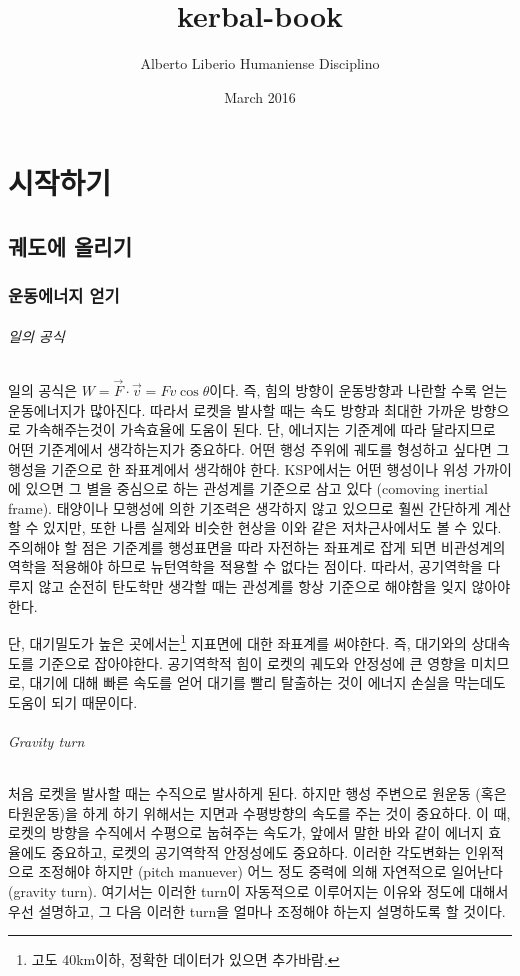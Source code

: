 \documentclass[9pt,twoside,openany]{amsbook}
\title{kerbal-book}
\author{Alberto Liberio Humaniense Disciplino}
\date{March 2016}
\begin{document}

\maketitle
\sf

\tableofcontents
\part{시작하기}
\chapter{궤도에 올리기}
\section{운동에너지 얻기}
\paragraph{일의 공식}
일의 공식은 $W=\vec{F} \cdot \vec{v} = F v \cos\theta$이다. 
즉, 힘의 방향이 운동방향과 나란할 수록 얻는 운동에너지가 많아진다. 
따라서 로켓을 발사할 때는 속도 방향과 최대한 가까운 방향으로 가속해주는것이 가속효율에 도움이 된다.
단, 에너지는 기준계에 따라 달라지므로 어떤 기준계에서 생각하는지가 중요하다. 
어떤 행성 주위에 궤도를 형성하고 싶다면 그 행성을 기준으로 한 좌표계에서 생각해야 한다. 
KSP에서는 어떤 행성이나 위성 가까이에 있으면 그 별을 중심으로 하는 관성계를 기준으로 삼고 있다 (comoving inertial frame). 
태양이나 모행성에 의한 기조력은 생각하지 않고 있으므로 훨씬 간단하게 계산할 수 있지만, 또한 나름 실제와 비슷한 현상을 이와 같은 저차근사에서도 볼 수 있다. 
주의해야 할 점은 기준계를 행성표면을 따라 자전하는 좌표계로 잡게 되면 비관성계의 역학을 적용해야 하므로 뉴턴역학을 적용할 수 없다는 점이다. 
따라서, 공기역학을 다루지 않고 순전히 탄도학만 생각할 때는 관성계를 항상 기준으로 해야함을 잊지 않아야 한다.

단, 대기밀도가 높은 곳에서는\footnote{고도 40km이하, 정확한 데이터가 있으면 추가바람.} 지표면에 대한 좌표계를 써야한다. 즉, 대기와의 상대속도를 기준으로 잡아야한다. 공기역학적 힘이 로켓의 궤도와 안정성에 큰 영향을 미치므로, 대기에 대해 빠른 속도를 얻어 대기를 빨리 탈출하는 것이 에너지 손실을 막는데도 도움이 되기 때문이다.

\paragraph{Gravity turn}
처음 로켓을 발사할 때는 수직으로 발사하게 된다. 하지만 행성 주변으로 원운동 (혹은 타원운동)을 하게 하기 위해서는 지면과 수평방향의 속도를 주는 것이 중요하다. 
이 때, 로켓의 방향을 수직에서 수평으로 눕혀주는 속도가, 앞에서 말한 바와 같이 에너지 효율에도 중요하고, 로켓의 공기역학적 안정성에도 중요하다. 
이러한 각도변화는 인위적으로 조정해야 하지만 (pitch manuever) 어느 정도 중력에 의해 자연적으로 일어난다 (gravity turn).
여기서는 이러한 turn이 자동적으로 이루어지는 이유와 정도에 대해서 우선 설명하고, 그 다음 이러한 turn을 얼마나 조정해야 하는지 설명하도록 할 것이다.
\end{document}
